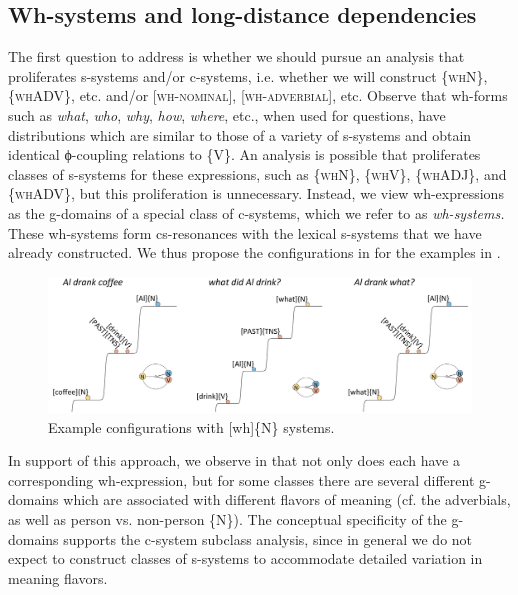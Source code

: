 \subsection{Wh-systems and long-distance dependencies}

The first question to address is whether we should pursue an analysis that proliferates s-systems and/or c-systems, i.e. whether we will construct \{\textsc{whN}\}, \{\textsc{whADV}\}, etc. and/or [\textsc{wh-nominal}], [\textsc{wh-adverbial}], etc. Observe that wh-forms such as \textit{what}, \textit{who}, \textit{why}, \textit{how}, \textit{where}, etc., when used for questions, have distributions which are similar to those of a variety of s-systems and obtain identical ϕ-coupling relations to \{V\}. An analysis is possible that proliferates classes of s-systems for these expressions, such as \{\textsc{whN}\}, \{\textsc{whV}\}, \{\textsc{whADJ}\}, and \{\textsc{whADV}\}, but this proliferation is unnecessary. Instead, we view wh-expressions as the g-domains of a special class of c-systems, which we refer to as \textit{wh-systems.} These wh-systems form cs-resonances with the lexical s-systems that we have already constructed. We thus propose the configurations in {} for the examples in .

  
\begin{figure}
\includegraphics[width=\textwidth]{figures/Tilsen-img158.png}
\caption{Example configurations with [wh]\{N\} systems.}
\label{fig:7:14}
\end{figure}
 

  In support of this approach, we observe in {} that not only does each  have a corresponding wh-expression, but for some  classes there are several different g-domains which are associated with different flavors of meaning (cf. the adverbials, as well as person vs. non-person \{N\}). The conceptual specificity of the g-domains supports the c-system subclass analysis, since in general we do not expect to construct classes of s-systems to accommodate detailed variation in meaning flavors.

